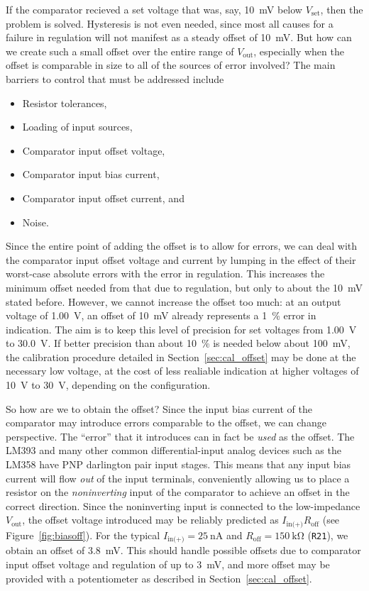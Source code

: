 \documentclass[letterpaper,twocolumn,11pt]{article}
\newcommand{\refdes}[1]{\texttt{#1}}
\begin{document}
If the comparator recieved a set voltage that was, say, \SI{10}{\mV} below
$V_\text{set}$, then the problem is solved. Hysteresis is not even needed, since
most all causes for a failure in regulation will not manifest as a steady offset
of \SI{10}{\mV}. But how can we create such a small offset over the entire range
of $V_\text{out}$, especially when the offset is comparable in size to all of
the sources of error involved? The main barriers to control that must be
addressed include
\begin{itemize}
  \item Resistor tolerances,
  \item Loading of input sources,
  \item Comparator input offset voltage,
  \item Comparator input bias current,
  \item Comparator input offset current, and
  \item Noise.
\end{itemize}

Since the entire point of adding the offset is to allow for errors, we can deal
with the comparator input offset voltage and current by lumping in the effect of
their worst-case absolute errors with the error in regulation. This increases
the minimum offset needed from that due to regulation, but only to about the
\SI{10}{\mV} stated before. However, we cannot increase the offset too much: at
an output voltage of \SI{1.00}{\V}, an offset of \SI{10}{\mV} already represents
a \SI{1}{\percent} error in indication. The aim is to keep this level of
precision for set voltages from \SI{1.00}{\V} to \SI{30.0}{\V}. If better
precision than about \SI{10}{\percent} is needed below about \SI{100}{\mV}, the
calibration procedure detailed in Section~\ref{sec:cal_offset} may be done at
the necessary low voltage, at the cost of less realiable indication at higher
voltages of \SI{10}{\V} to \SI{30}{\V}, depending on the configuration.

So how are we to obtain the offset? Since the input bias current of the
comparator may introduce errors comparable to the offset, we can change
perspective. The ``error'' that it introduces can in fact be \emph{used} as the
offset. The LM393 and many other common differential-input analog devices such
as the LM358 have PNP darlington pair input stages. This means that any input
bias current will flow \emph{out} of the input terminals, conveniently allowing
us to place a resistor on the \emph{noninverting} input of the comparator to
achieve an offset in the correct direction. Since the noninverting input is
connected to the low-impedance $V_\text{out}$, the offset voltage introduced may
be reliably predicted as $I_\text{in(+)} R_\text{off}$ (see
Figure~\ref{fig:biasoff}). For the typical $I_\text{in(+)} = \SI{25}{\nA}$ and
$R_\text{off} = \SI{150}{\kohm}$ (\refdes{R21}), we obtain an offset of
\SI{3.8}{\mV}. This should handle possible offsets due to comparator input
offset voltage and regulation of up to \SI{3}{\mV}, and more offset may be
provided with a potentiometer as described in Section~\ref{sec:cal_offset}.
\end{document}
